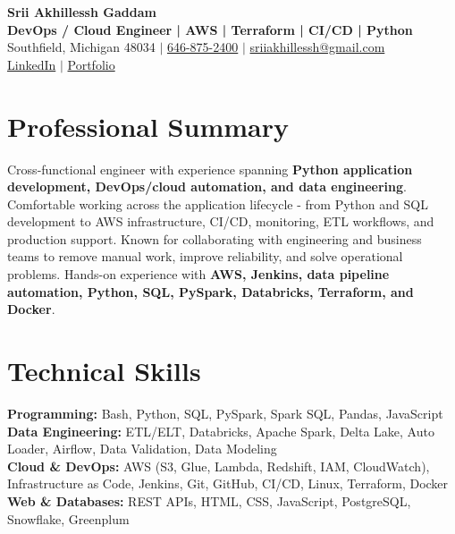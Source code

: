\documentclass[letterpaper,10pt]{article}
\begin{document}
\fontsize{9.35pt}{10.45pt}\selectfont

\begin{center}
    {\LARGE \textbf{Srii Akhillessh Gaddam}} \\[-1pt]
    \textbf{DevOps / Cloud Engineer | AWS | Terraform | CI/CD | Python} \\[2pt]
    Southfield, Michigan 48034 $|$
    \href{tel:6468752400}{646-875-2400} $|$
    \href{mailto:sriiakhillessh@gmail.com}{sriiakhillessh@gmail.com} \\[1pt]
    \href{https://www.linkedin.com/in/srii-akhiilessh-gaddam-b48668191/}{LinkedIn} $|$
    \href{https://sriiakhillesshg.github.io/portfolio/}{Portfolio}
\end{center}
\vspace{-8pt}

\section{Professional Summary}
\small{Cross-functional engineer with experience spanning \textbf{Python application development, DevOps/cloud automation, and data engineering}. Comfortable working across the application lifecycle - from Python and SQL development to AWS infrastructure, CI/CD, monitoring, ETL workflows, and production support. Known for collaborating with engineering and business teams to remove manual work, improve reliability, and solve operational problems. Hands-on experience with \textbf{AWS, Jenkins, data pipeline automation, Python, SQL, PySpark, Databricks, Terraform, and Docker}.}

\section{Technical Skills}
\small{
\textbf{Programming:} Bash, Python, SQL, PySpark, Spark SQL, Pandas, JavaScript \\
\textbf{Data Engineering:} ETL/ELT, Databricks, Apache Spark, Delta Lake, Auto Loader, Airflow, Data Validation, Data Modeling \\
\textbf{Cloud \& DevOps:} AWS (S3, Glue, Lambda, Redshift, IAM, CloudWatch), Infrastructure as Code, Jenkins, Git, GitHub, CI/CD, Linux, Terraform, Docker \\
\textbf{Web \& Databases:} REST APIs, HTML, CSS, JavaScript, PostgreSQL, Snowflake, Greenplum
}
\end{document}
